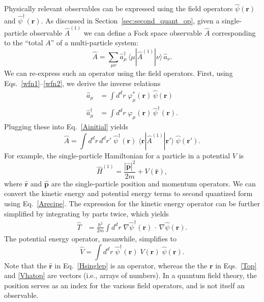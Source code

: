 \documentclass[prx,12pt]{revtex4-2}
\begin{document}
Physically relevant observables can be expressed using the field
operators $\hat{\psi}(\mathbf{r})$ and
$\hat{\psi}^\dagger(\mathbf{r})$.  As discussed in
Section~\ref{sec:second_quant_op}, given a single-particle observable
$\hat{A}^{(1)}$ we can define a Fock space observable $\hat{A}$
corresponding to the ``total $A$'' of a multi-particle system:
\begin{equation}
  \hat{A} = \sum_{\mu\nu} \hat{a}_\mu^\dagger \,
  \langle\mu|\hat{A}^{(1)}|\nu\rangle \, \hat{a}_\nu.
  \label{Ainitial}
\end{equation}
We can re-express such an operator using the field operators.  First,
using Eqs.~\eqref{wfn1}--\eqref{wfn2}, we derive the inverse relations
\begin{align}
  \hat{a}_\mu &= \int d^dr \; \varphi_\mu^*(\mathbf{r}) \, \hat{\psi}(\mathbf{r}) \\
  \hat{a}_\mu^\dagger &= \int d^dr \; \varphi_\mu(\mathbf{r}) \, \hat{\psi}^\dagger(\mathbf{r}).
\end{align}
Plugging these into Eq.~\eqref{Ainitial} yields
\begin{equation}
  \hat{A} = \int d^dr \,d^dr' \;\hat{\psi}^\dagger(\mathbf{r})
  \;\langle \mathbf{r}|\hat{A}^{(1)}|\mathbf{r}'\rangle \; \hat{\psi}(\mathbf{r}').
  \label{Arecipe}
\end{equation}
For example, the single-particle Hamiltonian for a particle in a
potential $V$ is
\begin{equation}
  \hat{H}^{(1)} = \frac{|\hat{\mathbf{p}}|^2}{2m} + V(\hat{\mathbf{r}}),
  \label{Hsinglep}
\end{equation}
where $\hat{\mathbf{r}}$ and $\hat{\mathbf{p}}$ are the
single-particle position and momentum operators.  We can convert the
kinetic energy and potential energy terms to second quantized form
using Eq.~\eqref{Arecipe}.  The expression for the kinetic energy
operator can be further simplified by integrating by parts twice,
which yields
\begin{align}
  \hat{T} &= \frac{\hbar^2}{2m} \int d^d r\; \nabla \hat{\psi}^\dagger
  (\mathbf{r}) \, \cdot \, \nabla \hat{\psi}(\mathbf{r}).
  \label{Top}
\end{align}
The potential energy operator, meanwhile, simplifies to
\begin{equation}
  \hat{V} = \int d^dr \;\hat{\psi}^\dagger(\mathbf{r}) \;V(\mathbf{r}) \; \hat{\psi}(\mathbf{r}).
  \label{Vhatop}
\end{equation}
Note that the $\hat{\mathbf{r}}$ in Eq.~\eqref{Hsinglep} is an
operator, whereas the the $\mathbf{r}$ in Eqs.~\eqref{Top} and
\eqref{Vhatop} are vectors (i.e., arrays of numbers).  In a quantum
field theory, the position serves as an index for the various field
operators, and is not itself an observable.
\end{document}

